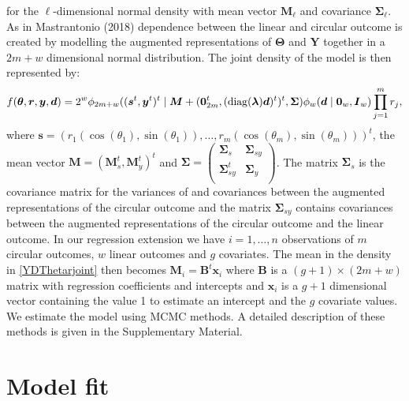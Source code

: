 \documentclass[12pt,]{article}
\begin{document}
for the \(\ell\)-dimensional normal density with mean vector
\(\boldsymbol{M}_\ell\) and covariance \(\boldsymbol{\Sigma}_\ell\). As
in Mastrantonio (2018) dependence between the linear and circular
outcome is created by modelling the augmented representations of
\(\boldsymbol{\Theta}\) and \(\boldsymbol{Y}\) together in a \(2m + w\)
dimensional normal distribution. The joint density of the model is then
represented by: \begin{equation}\label{YDThetarjoint} 
f(\boldsymbol{\theta}, \boldsymbol{r},
\boldsymbol{y}, \boldsymbol{d}) = 2^w\phi_{2m+w}((\boldsymbol{s}^t,
\boldsymbol{y}^t)^t \mid \boldsymbol{M} + (\boldsymbol{0}_{2m}^t, ({\rm
diag}(\boldsymbol{\lambda})\boldsymbol{d})^t)^t, \boldsymbol{\Sigma})
\phi_w(\boldsymbol{d} \mid \boldsymbol{0}_w, \boldsymbol{I}_w) \prod_{j =
1}^{m}r_j, 
\end{equation} \noindent where
\(\boldsymbol{s} = (r_1(\cos(\theta_1), \sin(\theta_1)), \dots, r_m(\cos(\theta_m), \sin(\theta_m)))^t\),
the mean vector
\(\boldsymbol{M} = (\boldsymbol{M}_s^t, \boldsymbol{M}_y^t)^t\) and
\(\boldsymbol{\Sigma} = \left ( \begin{matrix} \boldsymbol{\Sigma}_s & \boldsymbol{\Sigma}_{sy} \\ \boldsymbol{\Sigma}_{sy}^t & \boldsymbol{\Sigma}_y \\ \end{matrix} \right )\).
The matrix \(\boldsymbol{\Sigma}_s\) is the covariance matrix for the
variances of and covariances between the augmented representations of
the circular outcome and the matrix \(\boldsymbol{\Sigma}_{sy}\)
contains covariances between the augmented representations of the
circular outcome and the linear outcome. \newline \indent In our
regression extension we have \(i = 1, \dots, n\) observations of \(m\)
circular outcomes, \(w\) linear outcomes and \(g\) covariates. The mean
in the density in \eqref{YDThetarjoint} then becomes
\(\boldsymbol{M}_i = \boldsymbol{B}^t\boldsymbol{x}_i\) where
\(\boldsymbol{B}\) is a \((g + 1) \times (2m + w)\) matrix with
regression coefficients and intercepts and \(\boldsymbol{x}_i\) is a
\(g + 1\) dimensional vector containing the value 1 to estimate an
intercept and the \(g\) covariate values. \newline \indent We estimate
the model using MCMC methods. A detailed description of these methods is
given in the Supplementary Material.

\section{Model fit}
\end{document}
